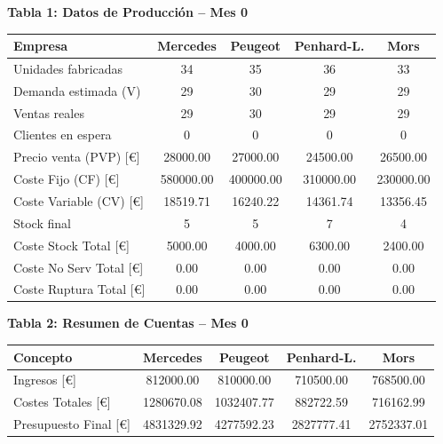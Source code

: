 \documentclass{standalone}
\begin{document}
	\leavevmode %
	
	\begin{minipage}{1.08\linewidth}
		\centering
		
		\textbf{Tabla 1: Datos de Producción – Mes 0}\\[0.5em]
		\begin{tabular}{@{}l
				S[table-format=2.0]
				S[table-format=2.0]
				S[table-format=2.0]
				S[table-format=2.0]@{}}
			\toprule
			\textbf{Empresa} & \textbf{Mercedes} & \textbf{Peugeot} & \textbf{Penhard-L.} & \textbf{Mors} \\
			\midrule
			Unidades fabricadas             & 34        & 35        & 36        & 33        \\
			Demanda estimada (V)            & 29        & 30        & 29        & 29        \\
			Ventas reales                   & 29        & 30        & 29        & 29        \\
			Clientes en espera              & 0         & 0         & 0         & 0         \\
			Precio venta (PVP) [\euro]      & 28000.00  & 27000.00  & 24500.00  & 26500.00  \\
			Coste Fijo (CF) [\euro]         & 580000.00 & 400000.00 & 310000.00 & 230000.00 \\
			Coste Variable (CV) [\euro]     & 18519.71  & 16240.22  & 14361.74  & 13356.45  \\
			Stock final                     & 5         & 5         & 7         & 4         \\
			Coste Stock Total [\euro]       & 5000.00   & 4000.00   & 6300.00   & 2400.00   \\
			Coste No Serv Total [\euro]     & 0.00      & 0.00      & 0.00      & 0.00      \\
			Coste Ruptura Total [\euro]     & 0.00      & 0.00      & 0.00      & 0.00      \\
			\bottomrule
		\end{tabular}
		
		\vspace{2em} %
		
		\textbf{Tabla 2: Resumen de Cuentas – Mes 0}\\[0.5em]
		\begin{tabular}{@{}l
				S[table-format=7.2]
				S[table-format=7.2]
				S[table-format=7.2]
				S[table-format=7.2]@{}}
			\toprule
			\textbf{Concepto} & \textbf{Mercedes} & \textbf{Peugeot} & \textbf{Penhard-L.} & \textbf{Mors} \\
			\midrule
			Ingresos [\euro]              & 812000.00  & 810000.00  & 710500.00  & 768500.00  \\
			Costes Totales [\euro]        & 1280670.08 & 1032407.77 & 882722.59  & 716162.99  \\
			Presupuesto Final [\euro]     & 4831329.92 & 4277592.23 & 2827777.41 & 2752337.01 \\
			\bottomrule
		\end{tabular}
		
	\end{minipage}
	
\end{document}

